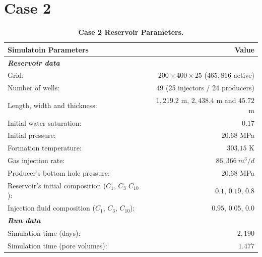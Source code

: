 \section{Case 2}

\FloatBarrier
\begin{center}
\begin{table}[h!]
\begin{adjustbox}{width=0.8\textwidth}
    \begin{threeparttable}
    \caption{\textbf{Case 2 Reservoir Parameters\supercite{fernandes}.}}
    \label{case1}
        \begin{tabular}{l r }
            \toprule
            Simulatoin Parameters & Value\\
            \midrule
	\rowcolor{red!20}\textit{\textbf{Reservoir data}}      & \\
	Grid:      &           $200\times400\times25$ ($465,816$ active) \\
	\rowcolor{blue!5}Number of wells:      &  49 (25 injectors / 24 producers) \\
	Length, width and thickness:      & $1,219.2$ m, $2,438.4$ m and $45.72$ m\\
	Initial water saturation:    & $0.17$ \\      
	\rowcolor{blue!5}Initial pressure:    &      $20.68$ MPa\\
	Formation temperature:    & $303.15$ K     \\
	Gas injection rate:    &       $86,366 \ m^{3}/d$ \\
	\rowcolor{blue!5}Producer’s bottom hole pressure:    &       $20.68$ MPa\\
	Reservoir’s initial composition ($C_{1}$, $C_{3}$ $C_{10}$): & $0.1$, $0.19$, $0.8$\\
	\rowcolor{blue!5}Injection ﬂuid composition ($C_{1}$, $C_{3}$, $C_{10}$):    &   $0.95$, $0.05$, $0.0$\\
	\rowcolor{red!20}\textit{\textbf{Run data}}    &       \\
	Simulation time (days):    &  $2,190$\\
	\rowcolor{blue!5}Simulation time (pore volumes):    & $1.477$\\
            \bottomrule
        \end{tabular}
    \end{threeparttable}
\end{adjustbox}    
\end{table}
\end{center}
\FloatBarrier


